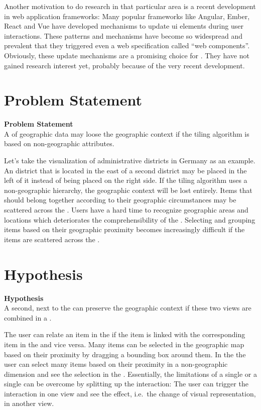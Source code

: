 Another motivation to do research in that particular area is a recent development in web application frameworks:
Many popular frameworks like Angular, Ember, React and Vue have developed mechanisms to update \gls{ui} elements during user interactions.
These patterns and mechanisms have become so widespread and prevalent that they triggered even a web specification called ``web components''.
Obviously, these update mechanisms are a promising choice for \cmvs{}.
They have not gained research interest yet, probably because of the very recent development.

\section{Problem Statement}
\begin{tcolorbox}
\textbf{Problem Statement} \\
A \tmap{} of geographic data may loose the geographic context if the tiling algorithm is based on non-geographic attributes.
\end{tcolorbox}

Let's take the visualization of administrative districts in Germany as an example.
An  district that is located in the east of a second district may be placed in the \tmap{} left of it instead of being placed on the right side.
If the tiling algorithm uses a non-geographic hierarchy, the geographic context will be lost entirely.
Items that should belong together according to their geographic circumstances may be scattered across the \tmap{}.
Users have a hard time to recognize geographic areas and locations which deteriorates the comprehensibility of the \tmap{}.
Selecting and grouping items based on their geographic proximity becomes increasingly difficult if the items are scattered across the \tmap{}.


\section{Hypothesis}\label{sec:introduction:hypothesis}

\begin{tcolorbox}
\textbf{Hypothesis} \\
A second, \gv{} next to the \tmap{} can preserve the geographic context if these two views are combined in a \cmv{}.
\end{tcolorbox}

The user can relate an item in the \tmap{} if the item is linked with the corresponding item in the \gv{} and vice versa.
Many items can be selected in the geographic map based on their proximity by dragging a bounding box around them.
In the \tmap{} the user can select many items based on their proximity in a non-geographic dimension and see the selection in the \gv{}.
Essentially,  the limitations of a single \tmap{} or a single \gv{} can be overcome by splitting up the interaction:
The user can trigger the interaction in one view and see the effect, i.e.\ the change of visual representation, in another view.


